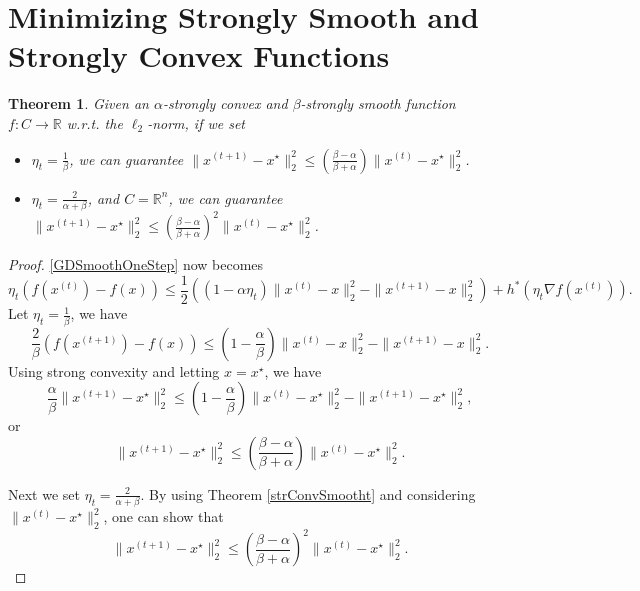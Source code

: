 \documentclass[openany]{book}
\newtheorem{theorem}{Theorem}[chapter]
\theoremstyle{definition}
\theoremstyle{remark}
\begin{document}
\section{Minimizing Strongly Smooth and Strongly Convex Functions}
\begin{theorem}
    Given an $\alpha$-strongly convex and $\beta$-strongly smooth function $f:C\to \mathbb{R}$ w.r.t. the $\ell_2$-norm, if we set
    \begin{itemize}
        \item $\eta_t=\frac{1}{\beta}$, we can guarantee $\|x^{(t+1)}-x^{\star}\|_2^2\le\left(\frac{\beta-\alpha}{\beta+\alpha}\right)\|x^{(t)}-x^{\star}\|_2^2$.
        \item $\eta_t=\frac{2}{\alpha+\beta}$, and $C=\mathbb{R}^n$, we can guarantee $\|x^{(t+1)}-x^{\star}\|_2^2\le\left(\frac{\beta-\alpha}{\beta+\alpha}\right)^2\|x^{(t)}-x^{\star}\|_2^2$.
    \end{itemize}
\end{theorem}
\begin{proof}
    \eqref{GDSmoothOneStep} now becomes
    \begin{equation*}
        \eta_t\left(f(x^{(t)})-f(x)\right)\le \frac{1}{2}\left((1-\alpha\eta_t)\|x^{(t)}-x\|_2^2-\|x^{(t+1)}-x\|_2^2\right)+h^*\left(\eta_t\nabla f(x^{(t)})\right).
    \end{equation*}
    Let $\eta_t=\frac{1}{\beta}$, we have
    \begin{equation*}
        \frac{2}{\beta}(f(x^{(t+1)})-f(x))\le\left(1-\frac{\alpha}{\beta}\right)\|x^{(t)}-x\|_2^2-\|x^{(t+1)}-x\|_2^2.
    \end{equation*}
    Using strong convexity and letting $x=x^{\star}$, we have
    \begin{equation*}
        \frac{\alpha}{\beta}\|x^{(t+1)}-x^{\star}\|_2^2\le\left(1-\frac{\alpha}{\beta}\right)\|x^{(t)}-x^{\star}\|_2^2-\|x^{(t+1)}-x^{\star}\|_2^2,
    \end{equation*}
    or
    \begin{equation*}
        \|x^{(t+1)}-x^{\star}\|_2^2\le\left(\frac{\beta-\alpha}{\beta+\alpha}\right)\|x^{(t)}-x^{\star}\|_2^2.
    \end{equation*}

    Next we set $\eta_t=\frac{2}{\alpha+\beta}$. By using Theorem \ref{strConvSmootht} and considering $\|x^{(t)}-x^{\star}\|_2^2$, one can show that
    \begin{equation*}
        \|x^{(t+1)}-x^{\star}\|_2^2\le\left(\frac{\beta-\alpha}{\beta+\alpha}\right)^2\|x^{(t)}-x^{\star}\|_2^2.
    \end{equation*}
\end{proof}
\end{document}
